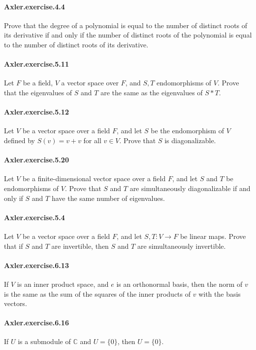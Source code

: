\documentclass{article}
\begin{document}
\paragraph{Axler.exercise.4.4} Prove that the degree of a polynomial is equal to the number of distinct roots of its derivative if and only if the number of distinct roots of the polynomial is equal to the number of distinct roots of its derivative.

\paragraph{Axler.exercise.5.11} Let $F$ be a field, $V$ a vector space over $F$, and $S, T$ endomorphisms of $V$. Prove that the eigenvalues of $S$ and $T$ are the same as the eigenvalues of $S * T$.

\paragraph{Axler.exercise.5.12} Let $V$ be a vector space over a field $F$, and let $S$ be the endomorphism of $V$ defined by $S(v) = v + v$ for all $v \in V$. Prove that $S$ is diagonalizable.

\paragraph{Axler.exercise.5.20} Let $V$ be a finite-dimensional vector space over a field $F$, and let $S$ and $T$ be endomorphisms of $V$. Prove that $S$ and $T$ are simultaneously diagonalizable if and only if $S$ and $T$ have the same number of eigenvalues.

\paragraph{Axler.exercise.5.4} Let $V$ be a vector space over a field $F$, and let $S, T: V \to F$ be linear maps. Prove that if $S$ and $T$ are invertible, then $S$ and $T$ are simultaneously invertible.

\paragraph{Axler.exercise.6.13} If $V$ is an inner product space, and $e$ is an orthonormal basis, then the norm of $v$ is the same as the sum of the squares of the inner products of $v$ with the basis vectors.

\paragraph{Axler.exercise.6.16} If $U$ is a submodule of $\mathbb{C}$ and $U = \{0\}$, then $U = \{0\}$.
\end{document}
